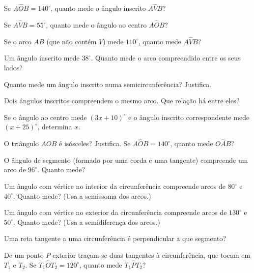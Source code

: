 \documentclass[12pt]{article}
\begin{document}
\begin{exercicios}
  \item Se $A\hat{O}B = 140^\circ$, quanto mede o ângulo inscrito $A\hat{V}B$?
  \item Se $A\hat{V}B = 55^\circ$, quanto mede o ângulo ao centro $A\hat{O}B$?
  \item Se o arco $AB$ (que não contém $V$) mede $110^\circ$, quanto mede $A\hat{V}B$?
  \item Um ângulo inscrito mede $38^\circ$. Quanto mede o arco compreendido entre os seus lados?
  \item Quanto mede um ângulo inscrito numa semicircunferência? Justifica.
  \item Dois ângulos inscritos compreendem o mesmo arco. Que relação há entre eles?
  \item Se o ângulo ao centro mede $(3x + 10)^\circ$ e o ângulo inscrito correspondente mede $(x + 25)^\circ$, determina $x$.
  \item O triângulo $AOB$ é isósceles? Justifica. Se $A\hat{O}B = 140^\circ$, quanto mede $O\hat{A}B$?
\end{exercicios}

\begin{exercicios}
  \item O ângulo de segmento (formado por uma corda e uma tangente) compreende um arco de $96^\circ$. Quanto mede?
  \item Um ângulo com vértice no interior da circunferência compreende arcos de $80^\circ$ e $40^\circ$. Quanto mede? (Usa a semissoma dos arcos.)
  \item Um ângulo com vértice no exterior da circunferência compreende arcos de $130^\circ$ e $50^\circ$. Quanto mede? (Usa a semidiferença dos arcos.)
  \item Uma reta tangente a uma circunferência é perpendicular a que segmento?
  \item De um ponto $P$ exterior traçam-se duas tangentes à circunferência, que tocam em $T_1$ e $T_2$. Se $T_1\hat{O}T_2 = 120^\circ$, quanto mede $T_1\hat{P}T_2$?
\end{exercicios}
\end{document}
